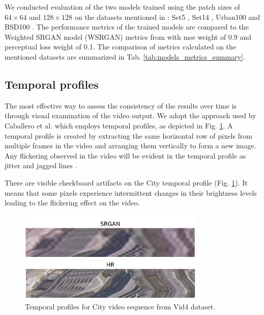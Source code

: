 \documentclass[conference]{IEEEtran}
\begin{document}
We conducted evaluation of the two models trained using the patch sizes of $64 \times 64$ and $128 \times 128$ on the datasets mentioned in \cite{weighted_srgan_2021}: Set5 \cite{set5_2012}, Set14 \cite{Set14_2012}, Urban100 \cite{urban100_2015} and BSD100 \cite{BSD100_2001}. The performance metrics of the trained models are compared to the Weighted SRGAN model (WSRGAN) metrics from \cite{weighted_srgan_2021} with \acrshort{mse} weight of 0.9 and perceptual loss weight of 0.1. The comparison of metrics calculated on the mentioned datasets are summarized in Tab. \ref{tab:models_metrics_summary}.

\subsection{Temporal profiles\label{sec:temporal_profiles}}

The most effective way to assess the consistency of the results over time is through visual examination of the video output. We adopt the approach used by Caballero et al. \cite{Real_Time_Video_Super_Resolution_with_Spatio_Temporal_Networks_and_Motion_Compensation_2016} which employs temporal profiles, as depicted in Fig. \ref{fig:city_temporal_profile}. A temporal profile is created by extracting the same horizontal row of pixels from multiple frames in the video and arranging them vertically to form a new image. Any flickering observed in the video will be evident in the temporal profile as jitter and jagged lines \cite{frvsr_2018}.

There are visible checkboard artifacts on the City temporal profile (Fig. \ref{fig:city_temporal_profile}). It means that some pixels experience intermittent changes in their brightness levels leading to the flickering effect on the video.

\begin{figure}[htb]
	\centering
    \centerline{\includegraphics[width=8.9cm]{results/tempo/city_temp_profile}}
	\caption{Temporal profiles for City video sequence from Vid4 dataset.}
	\label{fig:city_temporal_profile}
\end{figure}
\end{document}
